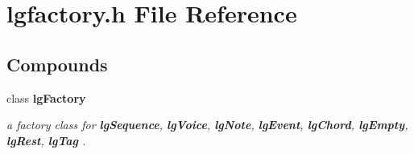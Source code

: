 \section{lgfactory.h File Reference}
\label{lgfactory_8h}
\subsection*{Compounds}
\begin{CompactItemize}
\item 
class {\bf lg\-Factory}
\begin{CompactList}\small\item\em a factory class for {\bf lg\-Sequence}, {\bf lg\-Voice}, {\bf lg\-Note}, {\bf lg\-Event}, {\bf lg\-Chord}, {\bf lg\-Empty}, {\bf lg\-Rest}, {\bf lg\-Tag} . \item\end{CompactList}\end{CompactItemize}
